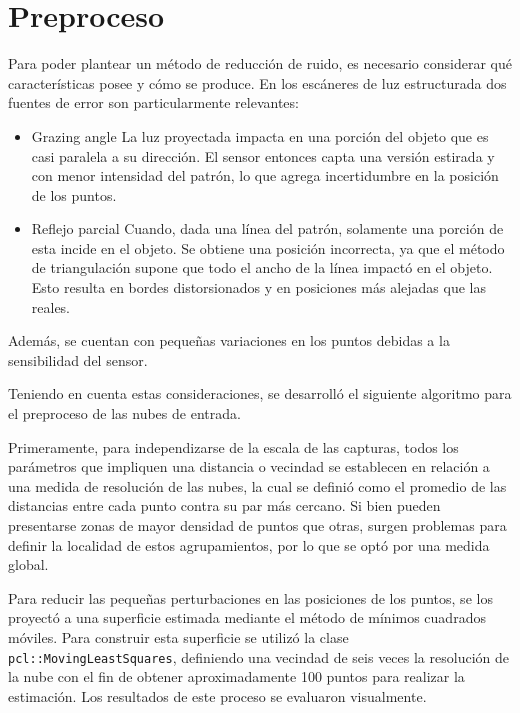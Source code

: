 \section{Preproceso}

Para poder plantear un método de reducción de ruido, es necesario considerar
qué características posee y cómo se produce.
En los escáneres de luz estructurada dos fuentes de error son particularmente relevantes:
\begin{itemize}
	\item Grazing angle %
		La luz proyectada impacta en una porción del objeto que es casi paralela a su dirección.
		El sensor entonces capta una versión estirada y con menor intensidad del patrón, lo que 
		agrega incertidumbre en la posición de los puntos.
	\item Reflejo parcial %
		Cuando, dada una línea del patrón, solamente una porción de esta incide en el objeto.
		Se obtiene una posición incorrecta, ya que el método de triangulación
		supone que todo el ancho de la línea impactó en el objeto.
		Esto resulta en bordes distorsionados y en posiciones más alejadas que las reales.
\end{itemize}
Además, se cuentan con pequeñas variaciones en los puntos debidas a la sensibilidad del sensor.

Teniendo en cuenta estas consideraciones, se desarrolló el siguiente algoritmo
para el preproceso de las nubes de entrada.

Primeramente, para independizarse de la escala de las capturas,
todos los parámetros que impliquen una distancia o vecindad
se establecen en relación a una medida de resolución de las nubes,
la cual se definió como el promedio de las distancias entre cada punto
contra su par más cercano.
Si bien pueden presentarse zonas de mayor densidad de puntos que otras,
surgen problemas para definir la localidad de estos agrupamientos,
por lo que se optó por una medida global.

Para reducir las pequeñas perturbaciones en las posiciones de los puntos,
se los proyectó a una superficie estimada mediante el método de mínimos cuadrados móviles.
Para construir esta superficie se utilizó la clase
\texttt{pcl::MovingLeastSquares}, definiendo una vecindad de seis veces la
resolución de la nube con el fin de obtener aproximadamente 100 puntos para
realizar la estimación.
Los resultados de este proceso se evaluaron visualmente.


